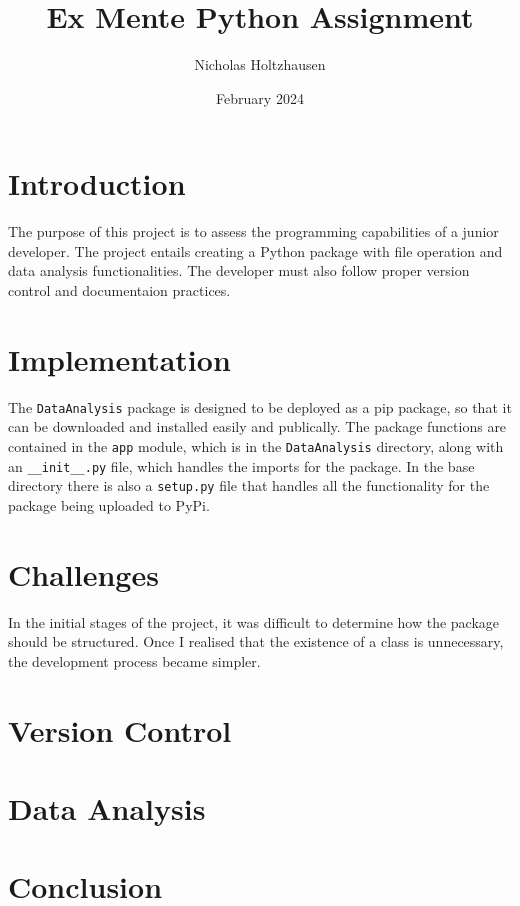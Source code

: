 \documentclass[12pt]{article}
\title{Ex Mente Python Assignment}
\author{Nicholas Holtzhausen}
\date{February 2024}
\begin{document}
\maketitle

\section{Introduction}
The purpose of this project is to assess the programming capabilities of a
junior developer. The project entails creating a Python package with file
operation and data analysis functionalities. The developer must also follow
proper version control and documentaion practices.

\section{Implementation}
The \verb|DataAnalysis| package is designed to be deployed as a pip package,
so that it can be downloaded and installed easily and publically. The package
functions are contained in the \verb|app| module, which is in the 
\verb|DataAnalysis| directory, along
with an \verb|__init__.py| file, which handles the imports for the package. In
the base directory there is also a \verb|setup.py| file that handles all the
functionality for the package being uploaded to PyPi.

\section{Challenges}
In the initial stages of the project, it was difficult to determine how the
package should be structured. Once I realised that the existence of a class
is unnecessary, the development process became simpler. 

\section{Version Control}

\section{Data Analysis}

\section{Conclusion}
\end{document}
